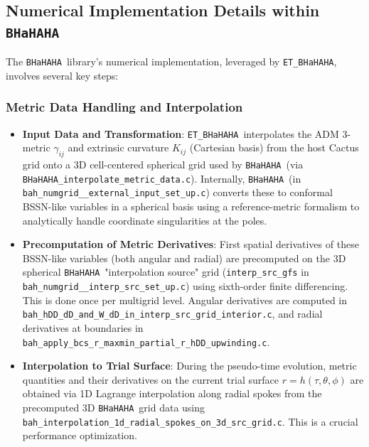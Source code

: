 \documentclass[a4paper,11pt]{article}
\newcommand{\thorn}[1]{{\tt #1}}
\newcommand{\BHaHAHA}{\thorn{ET\_BHaHAHA}} %
\newcommand{\bhahlib}{\texttt{BHaHAHA}} %
\begin{document}
\subsection{Numerical Implementation Details within \bhahlib}
The \bhahlib\ library's numerical implementation, leveraged by \BHaHAHA, involves several key steps:

\subsubsection{Metric Data Handling and Interpolation}
\begin{itemize}
    \item \textbf{Input Data and Transformation}: \BHaHAHA\ interpolates the ADM 3-metric $\gamma_{ij}$ and extrinsic curvature $K_{ij}$ (Cartesian basis) from the host Cactus grid onto a 3D cell-centered spherical grid used by \bhahlib\ (via \texttt{BHaHAHA\_interpolate\_metric\_data.c}). Internally, \bhahlib\ (in \texttt{bah\_numgrid\_\_external\_input\_set\_up.c}) converts these to conformal BSSN-like variables in a spherical basis using a reference-metric formalism \cite{Brown2009, Montero2012, Baumgarte2013} to analytically handle coordinate singularities at the poles.
    \item \textbf{Precomputation of Metric Derivatives}: First spatial derivatives of these BSSN-like variables (both angular and radial) are precomputed on the 3D spherical \bhahlib\ "interpolation source" grid (\texttt{interp\_src\_gfs} in \texttt{bah\_numgrid\_\_interp\_src\_set\_up.c}) using sixth-order finite differencing. This is done once per multigrid level. Angular derivatives are computed in \texttt{bah\_hDD\_dD\_and\_W\_dD\_in\_interp\_src\_grid\_interior.c}, and radial derivatives at boundaries in \texttt{bah\_apply\_bcs\_r\_maxmin\_partial\_r\_hDD\_upwinding.c}.
    \item \textbf{Interpolation to Trial Surface}: During the pseudo-time evolution, metric quantities and their derivatives on the current trial surface $r=h(\tau, \theta, \phi)$ are obtained via 1D Lagrange interpolation along radial spokes from the precomputed 3D \bhahlib\ grid data using \texttt{bah\_interpolation\_1d\_radial\_spokes\_on\_3d\_src\_grid.c}. This is a crucial performance optimization.
\end{itemize}
\end{document}
